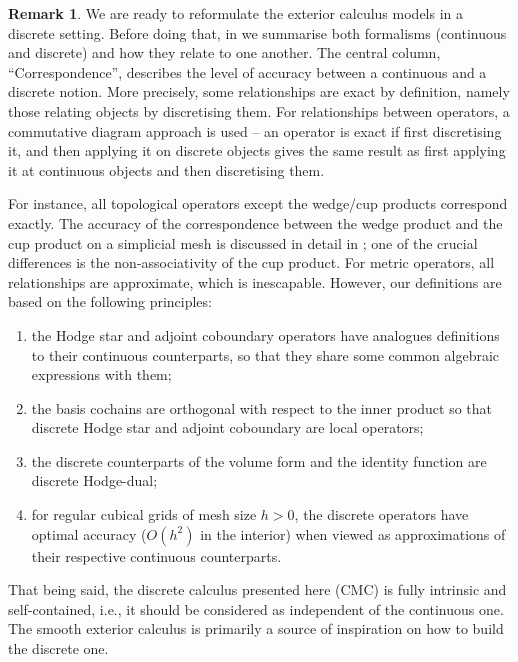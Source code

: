 \documentclass{elsarticle}
\theoremstyle{definition}
\newtheorem{remark}[theorem]{Remark}
\begin{document}
\begin{remark}
  We are ready to reformulate the exterior calculus models in a discrete setting.
  Before doing that, in  we summarise both formalisms (continuous and discrete) and how they relate to one another.
  The central column, ``Correspondence'', describes the level of accuracy between a continuous and a discrete notion.
  More precisely, some relationships are exact by definition, namely those relating objects by discretising them.
  For relationships between operators, a commutative diagram approach is used -- an operator is exact if first discretising it, and then applying it on discrete objects gives the same result as first applying it at continuous objects and then discretising them.

  For instance, all topological operators except the wedge/cup products correspond exactly.
  The accuracy of the correspondence between the wedge product and the cup product on a simplicial mesh is discussed in detail in \cite{wilson2007cochain};
  one of the crucial differences is the non-associativity of the cup product.
  For metric operators, all relationships are approximate, which is inescapable.
  However, our definitions are based on the following principles:
  \begin{enumerate}
    \item
      the Hodge star and adjoint coboundary operators have analogues definitions to their continuous counterparts, so that they share some common algebraic expressions with them;
    \item
      the basis cochains are orthogonal with respect to the inner product so that discrete Hodge star and adjoint coboundary are local operators;
    \item
      the discrete counterparts of the volume form and the identity function are discrete Hodge-dual;
    \item
      for regular cubical grids of mesh size $h > 0$, the discrete operators have optimal accuracy ($O(h^2)$ in the interior) when viewed as approximations of their respective continuous counterparts.
  \end{enumerate}
  That being said, the discrete calculus presented here (CMC) is fully intrinsic and self-contained, i.e., it should be considered as independent of the continuous one. The smooth exterior calculus is primarily a source of inspiration on how to build the discrete one.
\end{remark}
\end{document}
